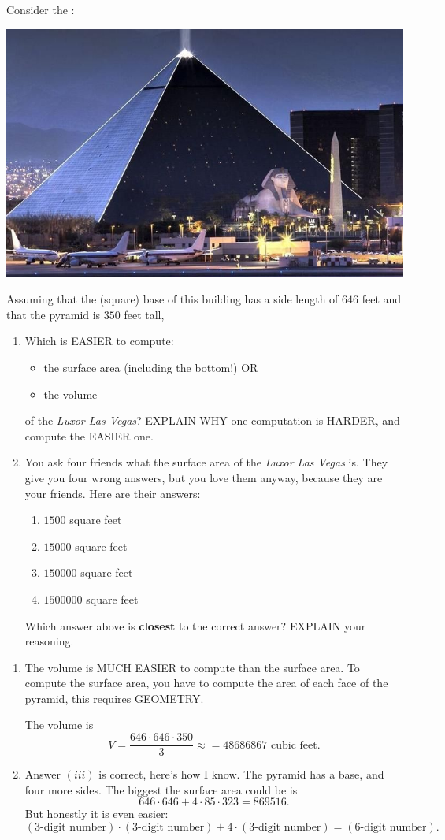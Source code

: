 \documentclass[nooutcomes,noauthor]{ximera}
\begin{document}
\begin{question}
  Consider the :
  \begin{center}
    \includegraphics[width=.4\textwidth]{pyramid.jpg} 
  \end{center}
 Assuming that the (square) base of this building has a side length of
 $646$ feet and that the pyramid is $350$ feet tall,
  \begin{enumerate}
  \item Which is EASIER to compute:
    \begin{itemize}
    \item the surface area (including the bottom!) OR
    \item the volume
    \end{itemize}
    of the \textit{Luxor Las Vegas}? EXPLAIN WHY one computation is
    HARDER, and compute the EASIER one.
  \item You ask four friends what the surface area of the
    \textit{Luxor Las Vegas} is. They give you four wrong answers, but
    you love them anyway, because they are your friends. Here are
    their answers:
    \begin{enumerate}
    \item $1500$ square feet
    \item $15000$ square feet
    \item $150000$ square feet
    \item $1500000$ square feet
    \end{enumerate}
    Which answer above is \textbf{closest} to the correct answer? EXPLAIN your reasoning.
  \end{enumerate}
  \begin{freeResponse}
    \begin{enumerate}
      \item The volume is MUCH EASIER to compute than the surface
        area. To compute the surface area, you have to compute the
        area of each face of the pyramid, this requires GEOMETRY.

        The volume is
        \[
        V = \frac{646\cdot 646\cdot 350}{3} \approx = 48686867 \text{ cubic feet}.
        \]
      \item Answer $(iii)$ is correct, here's how I know. The pyramid
        has a base, and four more sides. The biggest the surface area could be is
        \[
        646\cdot 646+ 4\cdot 85\cdot 323 = 869516.
        \]
        But honestly it is even easier:
        \[
        (\text{3-digit number}) \cdot (\text{3-digit number}) + 4\cdot
        (\text{3-digit number}) = (\text{6-digit number}).
        \]
    \end{enumerate}
  \end{freeResponse}
\end{question}
\mynewpage
\end{document}
